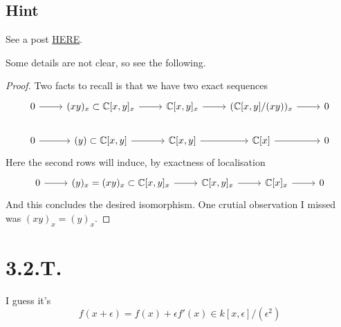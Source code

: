 \subsection{Hint}

See a post \href{https://math.stackexchange.com/questions/3769097/showing-that-mathbbcx-y-xy-x-cong-mathbbcx-x}{HERE}.

Some details are not clear, so see the following.
\begin{proof}
    Two facts to recall is that we have two exact sequences 
\[\begin{tikzcd}
	0 & {(xy)_x\subset \mathbb C[x,y]_x} & {\mathbb C[x,y]_x} & {(\mathbb C[x,y]/(xy))_x} & 0 \\
	0 & {(y)\subset \mathbb C[x,y]} & {\mathbb C[x,y]} & {\mathbb C[x]} & 0
	\arrow[from=1-1, to=1-2]
	\arrow[from=1-2, to=1-3]
	\arrow[from=1-3, to=1-4]
	\arrow[from=1-4, to=1-5]
	\arrow[from=2-1, to=2-2]
	\arrow[from=2-4, to=2-5]
	\arrow[from=2-3, to=2-4]
	\arrow[from=2-2, to=2-3]
\end{tikzcd}\]
Here the second rows will induce, by exactness of localisation 
\[\begin{tikzcd}
	0 & {(y)_x=(xy)_x\subset \mathbb C[x,y]_x} & {\mathbb C[x,y]_x} & {\mathbb C[x]_x} & 0
	\arrow[from=1-1, to=1-2]
	\arrow[from=1-4, to=1-5]
	\arrow[from=1-3, to=1-4]
	\arrow[from=1-2, to=1-3]
\end{tikzcd}\]
And this concludes the desired isomorphism. One crutial observation I missed was $(xy)_x=(y)_x$.

\end{proof}

\section{3.2.T.}

I guess it's 
\[f(x+\epsilon)=f(x)+\epsilon f'(x)\in k[x,\epsilon]/(\epsilon^2)\]

